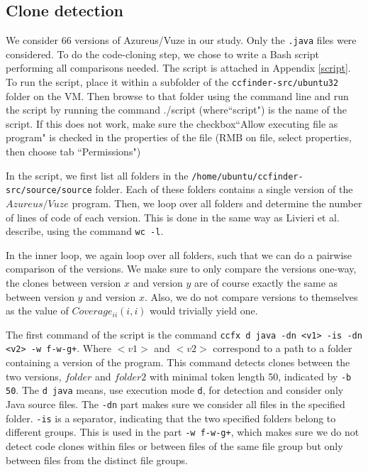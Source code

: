 \documentclass[a4paper,twoside, twocolumn, 11pt]{article}
\numberwithin{equation}{section}
\begin{document}
\subsection{Clone detection}
We consider 66 versions of Azureus/Vuze in our study. Only the \texttt{.java} files were considered.
To do the code-cloning step, we chose to write a Bash script performing all comparisons needed.
The script is attached in Appendix \ref{script}.
To run the script, place it within a subfolder of the \texttt{ccfinder-src/ubuntu32} folder on the VM. 
Then browse to that folder using the command line and run the script by running the command ./script (where``script") is the name of the script.
If this does not work, make sure the checkbox``Allow executing file as program" is checked in the properties of the file (RMB on file, select properties, then choose tab ``Permissions")

In the script, we first list all folders in the \texttt{/home/ubuntu/ccfinder-src/source/source} folder.
Each of these folders contains a single version of the $Azureus/Vuze$ program.
Then, we loop over all folders and determine the number of lines of code of each version.
This is done in the same way as Livieri et al. describe, using the command \texttt{wc -l}.

In the inner loop, we again loop over all folders, such that we can do a pairwise comparison of the versions.
We make sure to only compare the versions one-way, the clones between version $x$ and version $y$ are of course exactly the same as between version $y$ and version $x$.
Also, we do not compare versions to themselves as the value of $Coverage_{ii}(i,i)$ would trivially yield one.

The first command of the script is the command \texttt{ccfx d java -dn <v1> -is -dn <v2> -w f-w-g+}. 
Where $<v1>$ and $<v2>$ correspond to a path to a folder containing a version of the program.
This command detects clones between the two versions, $folder$ and $folder2$ with minimal token length 50, indicated by \texttt{-b 50}.
The \texttt{d java} means, use execution mode \texttt{d}, for detection and consider only Java source files.
The \texttt{-dn} part makes sure we consider all files in the specified folder.
\texttt{-is} is a separator, indicating that the two specified folders belong to different groups. 
This is used in the part \texttt{-w f-w-g+}, which makes sure we do not detect code clones within files or between files of the same file group but only between files from the distinct file groups.
\end{document}
